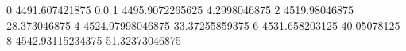 0 4491.607421875 0.0
1 4495.9072265625 4.2998046875
2 4519.98046875 28.373046875
4 4524.97998046875 33.37255859375
6 4531.658203125 40.05078125
8 4542.93115234375 51.32373046875
